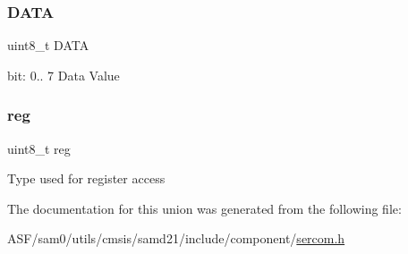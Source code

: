 \subsubsection{\texorpdfstring{DATA}{DATA}}
{\footnotesize\ttfamily uint8\+\_\+t D\+A\+TA}

bit\+: 0.. 7 Data Value \mbox{\label{union_s_e_r_c_o_m___i2_c_m___d_a_t_a___type_a9428adc9af4653a2050e2536b55dec8d}} 
\subsubsection{\texorpdfstring{reg}{reg}}
{\footnotesize\ttfamily uint8\+\_\+t reg}

Type used for register access 

The documentation for this union was generated from the following file\+:\begin{DoxyCompactItemize}
\item 
A\+S\+F/sam0/utils/cmsis/samd21/include/component/\mbox{\hyperlink{utils_2cmsis_2samd21_2include_2component_2sercom_8h}{sercom.\+h}}\end{DoxyCompactItemize}
